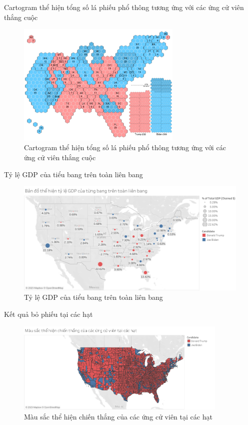 \documentclass[10pt]{beamer}
\theoremstyle{remark}
\theoremstyle{definition}
\begin{document}
\begin{frame}{Cartogram thể hiện tổng số lá phiếu phổ thông tương ứng với các ứng cử viên thắng cuộc}
	\begin{figure}[h!]
        \centering
        \includegraphics[width=0.7\textwidth]{State_Total_Vote_Cartogram.png}
        \caption{Cartogram thể hiện tổng số lá phiếu phổ thông tương ứng với các ứng cử viên thắng cuộc}
    \end{figure}
\end{frame}

\begin{frame}{Tỷ lệ GDP của tiểu bang trên toàn liên bang}
	\begin{figure}[h!]
        \centering
        \includegraphics[width=\textwidth]{figures/State_Percentage_GDP_Circle.png}
        \caption{Tỷ lệ GDP của tiểu bang trên toàn liên bang}
    \end{figure}
\end{frame}

\begin{frame}{Kết quả bỏ phiếu tại các hạt}
	\begin{figure}[h!]
        \centering
        \includegraphics[width=0.9\textwidth]{County_Candidate_Win.png}
        \caption{Màu sắc thể hiện chiến thắng của các ứng cử viên tại các hạt}
    \end{figure}
\end{frame}
\end{document}
